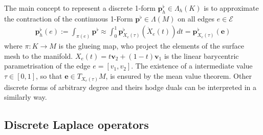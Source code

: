 \documentclass{scrartcl}
\newcommand{\M}{M}
\newcommand{\pfl}{\mathbf{p}^{\flat}}
\newcommand{\pflh}{\mathbf{p}^{\flat}_{h}}
\newcommand{\E}{\mathcal{E}}
\newcommand{\e}{\mathbf{e}}
\renewcommand{\v}{\mathbf{v}}
\begin{document}
  The main concept to represent a discrete 1-form \( \pflh\in\Lambda_{h}(K) \) is to approximate the contraction of the continuous 1-Form 
  \( \pfl\in\Lambda(M) \) on all edges \( e\in\E \)
  \begin{align}
    \pflh(e) := \int_{\pi(e)}\pfl \approx \int_{0}^{1} \pfl_{X_{e}(\tau)}\left( \dot{X}_{e}(t) \right) dt = \pfl_{X_{e}(\tau)}(\e)
  \end{align}
  where \( \pi:K\rightarrow \M \) is the glueing map, who project the elements of the surface mesh to the manifold.
  \( X_{e}(t) = t\v_{2} + (1-t)\v_{1} \) is the linear barycentric parametrisation of the edge \( e=\left[ v_{1}, v_{2} \right]\).
  The existence of a intermediate value \( \tau\in\left[ 0,1 \right] \), so that \( \e\in T_{X_{e}(\tau)}M \),
  is ensured by the mean value theorem.
  Other discrete forms of arbitrary degree and theirs hodge duals can be interpreted in a similarly way.

  \subsection{Discrete Laplace operators}
    
\end{document}
